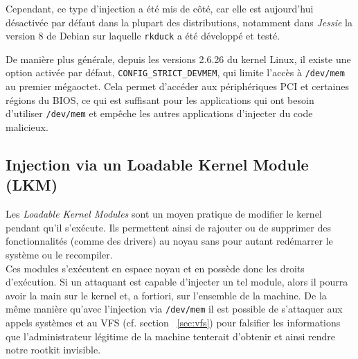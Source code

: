 \documentclass[12pt]{article}
\begin{document}
        Cependant, ce type d'injection a été mis de côté, car elle est aujourd'hui désactivée par défaut dans la plupart des distributions, notamment dans \textit{Jessie} la version 8 de Debian sur laquelle \texttt{rkduck} a été développé et testé.
        
        De manière plus générale, depuis les versions 2.6.26 du kernel Linux, il existe une option activée par défaut, \texttt{CONFIG\_STRICT\_DEVMEM}, qui limite l'accès à \texttt{/dev/mem} au premier mégaoctet. Cela permet d'accéder aux périphériques PCI et certaines régions du BIOS, ce qui est suffisant pour les applications qui ont besoin d'utiliser \texttt{/dev/mem} et empêche les autres applications d'injecter du code malicieux. 


    \subsection{Injection via un Loadable Kernel Module (LKM)}

        Les \textit{Loadable Kernel Modules} sont un moyen pratique de modifier le kernel pendant qu'il s'exécute. Ils permettent ainsi de rajouter ou de supprimer des fonctionnalités (comme des drivers) au noyau sans pour autant redémarrer le système ou le recompiler. \\
        
        Ces modules s'exécutent en espace noyau et en possède donc les droits d'exécution. Si un attaquant est capable d'injecter un tel module, alors il pourra avoir la main sur le kernel et, a fortiori, sur l'ensemble de la machine. De la même manière qu'avec l'injection via \texttt{/dev/mem} il est possible de s'attaquer aux appels systèmes et au VFS (cf. section ~\ref{sec:vfs}) pour falsifier les informations que l'administrateur légitime de la machine tenterait d'obtenir et ainsi rendre notre rootkit invisible. \\
        
\end{document}
